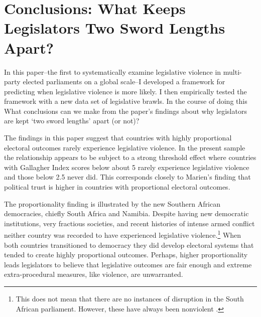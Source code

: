 \documentclass[a4paper]{article}\usepackage{graphicx, color}
\begin{document}
\section*{Conclusions: What Keeps Legislators Two Sword Lengths Apart?}

In this paper--the first to systematically examine legislative violence in multi-party elected parliaments on a global scale--I developed a framework for predicting when legislative violence is more likely. I then empirically tested the framework with a new data set of legislative brawls. In the course of doing this What conclusions can we make from the paper's findings about why legislators are kept `two sword lengths' apart (or not)?

The findings in this paper suggest that countries with highly proportional electoral outcomes rarely experience legislative violence. In the present sample the relationship appears to be subject to a strong threshold effect where countries with Gallagher Index scores below about 5 rarely experience legislative violence and those below 2.5 never did. This corresponds closely to Marien's \cite{Marien2011} finding that political trust is higher in countries with proportional electoral outcomes. 

The proportionality finding is illustrated by the new Southern African democracies, chiefly South Africa and Namibia. Despite having new democratic institutions, very fractious societies, and recent histories of intense armed conflict neither country was recorded to have experienced legislative violence.\footnote{This does not mean that there are no instances of disruption in the South African parliament. However, these have always been nonviolent \cite{Johnson2013}.} When both countries transitioned to democracy they did develop electoral systems that tended to create highly proportional outcomes. Perhaps, higher proportionality leads legislators to believe that legislative outcomes are fair enough and extreme extra-procedural measures, like violence, are unwarranted.    
\end{document}
